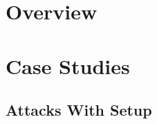 




\coverpage{\TITLE}{\SUBTITLE}{\AUTHOR}{\DATE}{\SUBJECT}
\newpage
\backgroundbarvisiblefalse
\pagestyle{plain}



\newpage
\tableofcontents

\part{Overview} \label{sec:overview}


% 


\part{Case Studies}
\chapter{Attacks With Setup} \label{ch:case-studies-setup}

